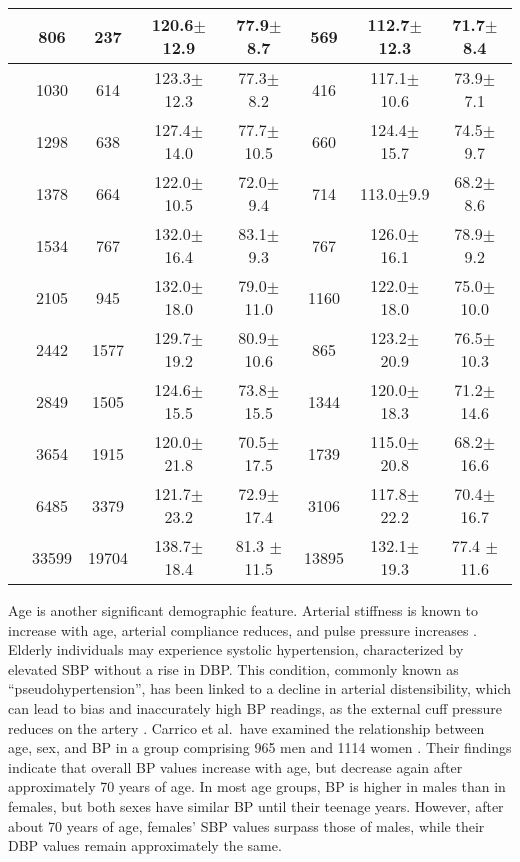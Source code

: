\documentclass[journal,article,moreauthors]{Definitions/mdpi}
\begin{document}
\begin{table}[tb]
\begin{center}
\begin{tabular}{rccccccc}
\\\hline
\citep{Song2016-ho} & 806 & 237 & 120.6$\pm$12.9 & 77.9$\pm$8.7 & 569 & 112.7$\pm$12.3 & 71.7$\pm$8.4
\\\hline
\citep{lan2012prevalence} & 1030 & 614  & 123.3$\pm$12.3 & 77.3$\pm$8.2  & 416 & 117.1$\pm$10.6 & 73.9$\pm$7.1
\\\hline
\citep{privvsek2018epidemiological} & 1298 & 638  & 127.4$\pm$14.0 & 77.7$\pm$10.5 & 660 & 124.4$\pm$15.7  & 
74.5$\pm$9.7
\\\hline
\citep{cui2002genes} & 1378 & 664 & 122.0$\pm$10.5 & 72.0$\pm$9.4 & 714 & 113.0$\pm$9.9 & 68.2$\pm$8.6
\\\hline
\citep{cui2002genes} & 1534 & 767  & 132.0$\pm$16.4 & 83.1$\pm$9.3  & 767 & 126.0$\pm$16.1 & 78.9$\pm$9.2
\\\hline
\citep{vallee2019relationship} & 2105 & 945  & 132.0$\pm$18.0 & 79.0$\pm$11.0 & 1160 & 122.0$\pm$18.0  & 
75.0$\pm$10.0
\\\hline
\citep{Giggey2011-ri} & 2442 & 1577 & 129.7$\pm$19.2 & 80.9$\pm$10.6 & 865 & 123.2$\pm$20.9 & 76.5$\pm$10.3
\\\hline
\citep{bourgeois2017associations} & 2849 & 1505  & 124.6$\pm$15.5 & 73.8$\pm$15.5 & 1344 & 120.0$\pm$18.3  & 71.2$\pm$14.6
\\\hline
\citep{bourgeois2017associations} & 3654 & 1915  & 120.0$\pm$21.8 & 70.5$\pm$17.5 & 1739 & 115.0$\pm$20.8  & 68.2$\pm$16.6
\\\hline
\citep{bourgeois2017associations} & 6485 & 3379 & 121.7$\pm$23.2 & 72.9$\pm$17.4 & 3106 & 117.8$\pm$22.2  & 70.4$\pm$16.7
\\\hline
\citep{pan1986role} & 33599 & 19704  & 138.7$\pm$18.4 & 81.3 $\pm$11.5 & 13895 & 132.1$\pm$19.3 & 77.4 $\pm$11.6
\\
\bottomrule
\end{tabular}
\end{center}
\end{table}

Age is another significant demographic feature. Arterial stiffness is known to increase with age, arterial compliance reduces, and pulse pressure increases \citep{muntner2019measurement}. Elderly individuals may experience systolic hypertension, characterized by elevated SBP without a rise in DBP. This condition, commonly known as ``pseudohypertension'', has been linked to a decline in arterial distensibility, which can lead to bias and inaccurately high BP readings, as the external cuff pressure reduces on the artery \citep{muntner2019measurement}. Carrico et al.\ have examined the relationship between age, sex, and BP in a group comprising 965 men and 1114 women \citep{carrico2013predictive}. Their findings indicate that overall BP values increase with age, but decrease again after approximately 70 years of age. In most age groups, BP is higher in males than in females, but both sexes have similar BP until their teenage years. However, after about 70 years of age, females' SBP values surpass those of males, while their DBP values remain approximately the same.
\end{document}
